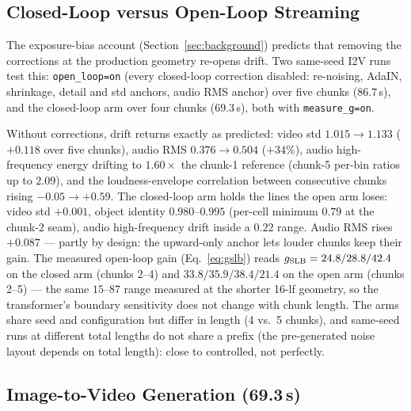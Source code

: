 \documentclass[12pt]{article}
\begin{document}
\subsection{Closed-Loop versus Open-Loop Streaming}
\label{sec:exp_ab}

The exposure-bias account (Section~\ref{sec:background}) predicts that
removing the corrections at the production geometry re-opens drift.  Two
same-seed I2V runs test this: \texttt{open\_loop=on} (every closed-loop
correction disabled: re-noising, AdaIN, shrinkage, detail and std anchors,
audio RMS anchor) over five chunks ($86.7$\,s), and the closed-loop arm over
four chunks ($69.3$\,s), both with \texttt{measure\_g=on}.

Without corrections, drift returns exactly as predicted: video std
$1.015\to1.133$ ($+0.118$ over five chunks), audio RMS $0.376\to0.504$
($+34\%$), audio high-frequency energy drifting to $1.60\times$ the chunk-1
reference (chunk-5 per-bin ratios up to $2.09$), and the loudness-envelope
correlation between consecutive chunks rising $-0.05\to+0.59$.  The
closed-loop arm holds the lines the open arm loses: video std $+0.001$,
object identity $0.980$--$0.995$ (per-cell minimum $0.79$ at the chunk-2
seam), audio high-frequency drift inside a $0.22$ range.  Audio RMS rises
$+0.087$ --- partly by design: the upward-only anchor lets louder chunks keep
their gain.  The measured open-loop gain (Eq.~\eqref{eq:gslb}) reads
$g_{\rm SLB}=24.8/28.8/42.4$ on the closed arm (chunks 2--4) and
$33.8/35.9/38.4/21.4$ on the open arm (chunks 2--5) --- the same $15$--$87$
range measured at the shorter 16-lf geometry, so the transformer's boundary
sensitivity does not change with chunk length.  The arms share seed and
configuration but differ in length (4 vs.\ 5 chunks), and same-seed runs at
different total lengths do not share a prefix (the pre-generated noise layout
depends on total length): close to controlled, not perfectly.

\subsection{Image-to-Video Generation (\texorpdfstring{69.3\,s}{69.3 s})}
\label{sec:exp_i2v}
\end{document}
